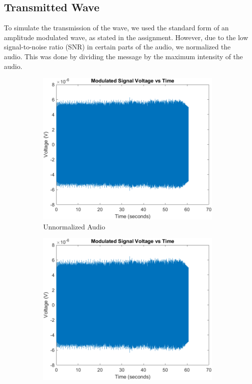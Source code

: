 \subsection{Transmitted Wave}
    To simulate the transmission of the wave, we used the standard form of an amplitude modulated wave, as stated in the assignment. However, due to the low signal-to-noise ratio (SNR) in certain parts of the audio, we normalized the audio. This was done by dividing the message by the maximum intensity of the audio.

    \begin{figure}[H]
        \centering  
        \begin{subfigure}[b]{0.48\textwidth}
            \includegraphics[width=\textwidth]{Images/Modulated Signal Before Normalization.png}
            \caption{Unnormalized Audio}
            \label{fig:AudioBeforeNorm}
        \end{subfigure}
        \hfill
        \begin{subfigure}[b]{0.48\textwidth}
            \includegraphics[width=\textwidth]{Images/Modulated Signal After Normalization.png}

\end{subfigure}
\end{figure}
